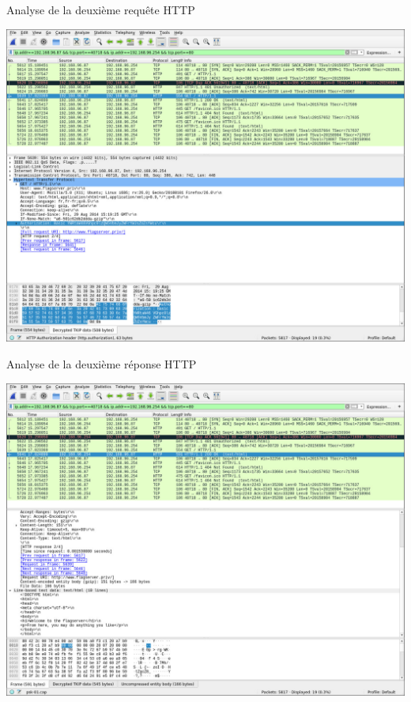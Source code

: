 \documentclass[10pt,sans,usenames,dvipsnames,french,compress]{beamer}
\begin{document}
\begin{frame}{Analyse de la deuxième requête HTTP}
	\vspace{-2mm}
	\begin{center}
		\includegraphics[width=0.85\linewidth]{118/wireshark6}
	\end{center}
\end{frame}

\begin{frame}{Analyse de la deuxième réponse HTTP}
	\vspace{-2mm}
	\begin{center}
		\includegraphics[width=0.85\linewidth]{118/wireshark7}
	\end{center}
\end{frame}
\end{document}
